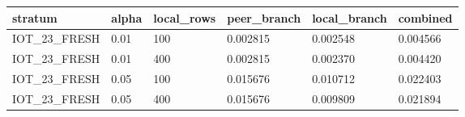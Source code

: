 \begin{tabular}{llllll}
\toprule
stratum & alpha & local\_rows & peer\_branch & local\_branch & combined \\
\midrule
IOT\_23\_FRESH & 0.01 & 100 & 0.002815 & 0.002548 & 0.004566 \\
IOT\_23\_FRESH & 0.01 & 400 & 0.002815 & 0.002370 & 0.004420 \\
IOT\_23\_FRESH & 0.05 & 100 & 0.015676 & 0.010712 & 0.022403 \\
IOT\_23\_FRESH & 0.05 & 400 & 0.015676 & 0.009809 & 0.021894 \\
\bottomrule
\end{tabular}

